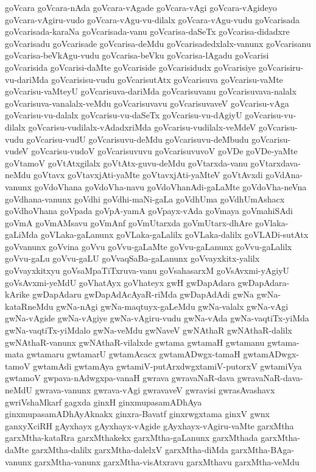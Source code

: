 {goVcara
goVcara-nAda
goVcara-vAgade
goVcara-vAgi
goVcara-vAgideyo
goVcara-vAgiru-vudo
goVcara-vAgu-vu-dilalx
goVcara-vAgu-vudu
goVcarisada
goVcarisada-karaNa
goVcarisada-vanu
goVcarisa-daSeTx
goVcarisa-didadxre
goVcarisadu
goVcarisade
goVcarisa-deMdu
goVcarisadedxlalx-vanunx
goVcarisanu
goVcarisa-beVkAgu-vudu
goVcarisa-beVku
goVcarisa-lAgadu
goVcarisi
goVcarisida
goVcarisi-daMte
goVcariside
goVcarisidudx
goVcarisiye
goVcarisiru-vu-dariMda
goVcarisisu-vudu
goVcarisutAtx
goVcarisuva
goVcarisu-vaMte
goVcarisu-vaMteyU
goVcarisuva-dariMda
goVcarisuvanu
goVcarisuvava-nalalx
goVcarisuva-vanalalx-veMdu
goVcarisuvavu
goVcarisuvaveV
goVcarisu-vAga
goVcarisu-vu-dalalx
goVcarisu-vu-daSeTx
goVcarisu-vu-dAgiyU
goVcarisu-vu-dilalx
goVcarisu-vudilalx-vAdadxriMda
goVcarisu-vudilalx-veMdeV
goVcarisu-vudu
goVcarisu-vudU
goVcarisuvu-deMdu
goVcarisuvu-deMbudu
goVcarisu-vudeV
goVcarisu-vudoV
goVcarisuvuvu
goVcarisuvuvoV
goVDe
goVDe-yaMte
goVtamoV
goVtAtxgilalx
goVtAtx-guvu-deMdu
goVtarxda-vanu
goVtarxdava-neMdu
goVtavx
goVtavxjAti-yaMte
goVtavxjAti-yaMteV
goVtAvxdi
goVdAna-vanunx
goVdoVhana
goVdoVha-navu
goVdoVhanAdi-gaLaMte
goVdoVha-neVna
goVdhana-vanunx
goVdhi
goVdhi-maNi-gaLa
goVdhUma
goVdhUmAshacx
goVdhoVhana
goVpada
goVpA-yamA
goVpayx-vAda
goVmaya
goVmahiSAdi
goVmA
goVmAMsavu
goVmAnf
goVmUtarxda
goVmUtarx-dhAre
goVlaka-gaLiMda
goVLaka-gaLanunx
goVLaka-gaLalilx
goVLaka-dalilx
goVLADi-sutAtx
goVvanunx
goVvina
goVvu
goVvu-gaLaMte
goVvu-gaLanunx
goVvu-gaLalilx
goVvu-gaLu
goVvu-gaLU
goVvaqSaBa-gaLanunx
goVvayxkitx-yalilx
goVvayxkitxyu
goVsaMpaTiTxruva-vanu
goVsahasarxM
goVsAvxmi-yAgiyU
goVsAvxmi-yeMdU
goVhatAyx
goVhateyx
gwH
gwDapAdara
gwDapAdara-kArike
gwDapAdaru
gwDapAdAcAyaR-riMda
gwDapAdAdi
gwNa
gwNa-kataRneMdu
gwNa-nAgi
gwNa-maqtuyx-gaLeMdu
gwNa-valalx
gwNa-vAgi
gwNa-vAgide
gwNa-vAgiye
gwNa-vAgiru-vudu
gwNa-vAda
gwNa-vaqtiTx-yiMda
gwNa-vaqtiTx-yiMdalo
gwNa-veMdu
gwNaveV
gwNAthaR
gwNAthaR-dalilx
gwNAthaR-vanunx
gwNAthaR-vilalxde
gwtama
gwtamaH
gwtamanu
gwtama-mata
gwtamaru
gwtamarU
gwtamAcacx
gwtamADwgx-tamaH
gwtamADwgx-tamoV
gwtamAdi
gwtamAya
gwtamiV-putArxdwgxtamiV-putorxV
gwtamiVya
gwtamoV
gwpava-nAdwgxpa-vanaH
gwrava
gwravaNaR-dava
gwravaNaR-dava-neMdU
gwrava-vanunx
gwrava-vAgi
gwravaveV
gwravisi
gwrasAvashavx
gwriVshaMkarf
gagxda
ginxH
ginxmupasamADhAya
ginxmupasamADhAyAknakx
ginxra-Bavatf
ginxrwgxtama
ginxV
gwnx
ganxyXciRH
gAyxhayx
gAyxhayx-vAgide
gAyxhayx-vAgiru-vaMte
garxMtha
garxMtha-kataRra
garxMthakekx
garxMtha-gaLanunx
garxMthada
garxMtha-daMte
garxMtha-dalilx
garxMtha-dalelxV
garxMtha-diMda
garxMtha-BAga-vanunx
garxMtha-vanunx
garxMtha-visAtxravu
garxMthavu
garxMtha-veMdu
}
